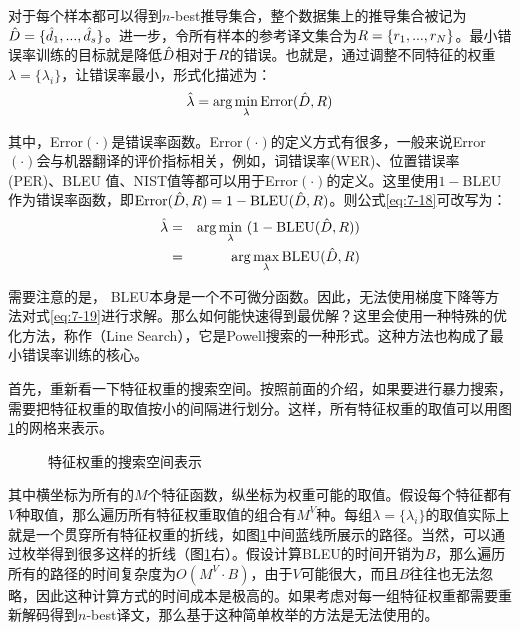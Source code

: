 \parinterval 对于每个样本都可以得到$n$-best推导集合，整个数据集上的推导集合被记为$\hat{{D}} = \{\hat{{d}}_{1},...,\hat{{d}}_{s}\}$。进一步，令所有样本的参考译文集合为${R} = \{{r}_1,...,{r}_N\}$。最小错误率训练的目标就是降低$\hat{{D}}$相对于${R}$的错误。也就是，通过调整不同特征的权重$\lambda = \{ \lambda_i \}$，让错误率最小，形式化描述为：
\begin{eqnarray}
\hat{\lambda} = \arg\min_{\lambda} \textrm{Error}(\hat{{D}},{R})
\label{eq:7-18}
\end{eqnarray}

\noindent 其中，\textrm{Error}$(\cdot)$是错误率函数。\textrm{Error}$(\cdot)$的定义方式有很多，一般来说\textrm{Error}$(\cdot)$会与机器翻译的评价指标相关，例如，词错误率(WER)、位置错误率(PER)、BLEU 值、NIST值等都可以用于\textrm{Error}$(\cdot)$的定义。这里使用$1-$BLEU作为错误率函数，即$\textrm{Error}(\hat{{D}},{R}) = 1 - \textrm{BLEU}(\hat{{D}},{R})$。则公式\eqref{eq:7-18}可改写为：
\begin{eqnarray}
\hat{\lambda} &=& \arg\min_{\lambda}\ (1 - \textrm{BLEU}(\hat{{D}},{R}))   \nonumber \\
&=& \arg\max_{\lambda} \textrm{BLEU}(\hat{{D}},{R})
\label{eq:7-19}
\end{eqnarray}

\parinterval 需要注意的是， BLEU本身是一个不可微分函数。因此，无法使用梯度下降等方法对式\eqref{eq:7-19}进行求解。那么如何能快速得到最优解？这里会使用一种特殊的优化方法，称作{\small{}}（Line Search），它是Powell搜索的一种形式。这种方法也构成了最小错误率训练的核心。

\parinterval 首先，重新看一下特征权重的搜索空间。按照前面的介绍，如果要进行暴力搜索，需要把特征权重的取值按小的间隔进行划分。这样，所有特征权重的取值可以用图\ref{fig:7-23}的网格来表示。

\begin{figure}[htp]
\centering

\caption{特征权重的搜索空间表示}
\label{fig:7-23}
\end{figure}

\parinterval 其中横坐标为所有的$M$个特征函数，纵坐标为权重可能的取值。假设每个特征都有$V$种取值，那么遍历所有特征权重取值的组合有$M^V$种。每组$\lambda = \{\lambda_i\}$的取值实际上就是一个贯穿所有特征权重的折线，如图\ref{fig:7-23}中间蓝线所展示的路径。当然，可以通过枚举得到很多这样的折线（图\ref{fig:7-23}右）。假设计算BLEU的时间开销为$B$，那么遍历所有的路径的时间复杂度为$O(M^V \cdot B)$，由于$V$可能很大，而且$B$往往也无法忽略，因此这种计算方式的时间成本是极高的。如果考虑对每一组特征权重都需要重新解码得到$n$-best译文，那么基于这种简单枚举的方法是无法使用的。

